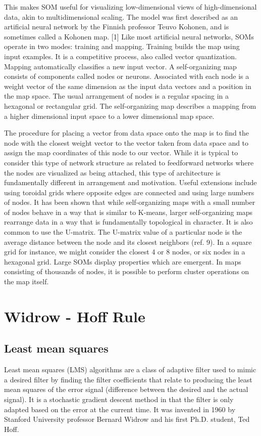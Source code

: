 \documentclass[a4paper,11pt]{report}
\begin{document}
This makes SOM useful for visualizing low-dimensional views of
high-dimensional data, akin to multidimensional scaling. The model
was first described as an artificial neural network by the Finnish
professor Teuvo Kohonen, and is sometimes called a Kohonen map.
[1] Like most artificial neural networks, SOMs operate in two
modes: training and mapping. Training builds the map using input
examples. It is a competitive process, also called vector
quantization. Mapping automatically classifies a new input vector.
A self-organizing map consists of components called nodes or
neurons. Associated with each node is a weight vector of the same
dimension as the input data vectors and a position in the map
space. The usual arrangement of nodes is a regular spacing in a
hexagonal or rectangular grid. The self-organizing map describes a
mapping from a higher dimensional input space to a lower
dimensional map space.

The procedure for placing a vector from data space onto the map is
to find the node with the closest weight vector to the vector
taken from data space and to assign the map coordinates of this
node to our vector. While it is typical to consider this type of
network structure as related to feedforward networks where the
nodes are visualized as being attached, this type of architecture
is fundamentally different in arrangement and motivation. Useful
extensions include using toroidal grids where opposite edges are
connected and using large numbers of nodes. It has been shown that
while self-organizing maps with a small number of nodes behave in
a way that is similar to K-means, larger self-organizing maps
rearrange data in a way that is fundamentally topological in
character. It is also common to use the U-matrix. The U-matrix
value of a particular node is the average distance between the
node and its closest neighbors (ref. 9). In a square grid for
instance, we might consider the closest 4 or 8 nodes, or six nodes
in a hexagonal grid. Large SOMs display properties which are
emergent. In maps consisting of thousands of nodes, it is possible
to perform cluster operations on the map itself.
\newpage
\section{Widrow - Hoff Rule}

\subsection{Least mean squares} Least mean squares (LMS) algorithms
are a class of adaptive filter used to mimic a desired filter by
finding the filter coefficients that relate to producing the least
mean squares of the error signal (difference between the desired
and the actual signal). It is a stochastic gradient descent method
in that the filter is only adapted based on the error at the
current time. It was invented in 1960 by Stanford University
professor Bernard Widrow and his first Ph.D. student, Ted Hoff.
\end{document}
